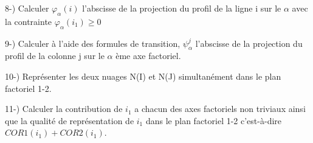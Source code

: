 \documentclass[16pt,a4paper]{article}
\begin{document}
8-) Calculer $\varphi_\alpha(i)$ l'abscisse de la projection du profil de la ligne i sur le $\alpha$  avec la contrainte $\varphi_\alpha(i_1) \geq 0$


9-) Calculer  à l'aide des formules de transition,   $\psi_{\alpha}^j$ l’abscisse de la projection du profil de la colonne j sur le $\alpha$ ème axe factoriel.

10-) Représenter les deux nuages N(I) et N(J) simultanément dans le plan factoriel 1-2.

11-) Calculer la contribution de $i_1$ a chacun des axes factoriels non triviaux ainsi que la qualité de représentation de $i_1$ dans le plan factoriel 1-2 c’est-à-dire $COR1(i_1) + COR2(i_1)$.
 

\end{document}
